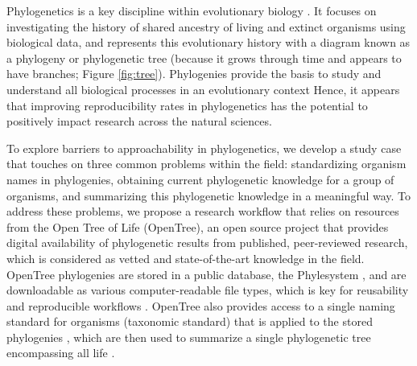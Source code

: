 \documentclass[12pt]{article}
\begin{document}
Phylogenetics is a key discipline within evolutionary biology \citep{dobzhansky1973nothing}.
It focuses on investigating the history of shared ancestry of living and extinct
organisms using biological data,
and represents this evolutionary history with a diagram known as a phylogeny
or phylogenetic tree (because it grows through time and appears to have branches;
Figure \ref{fig:tree}).
Phylogenies provide the basis to study and understand all biological processes
in an evolutionary context \citep{dobzhansky1973nothing}
Hence, it appears that improving reproducibility rates in phylogenetics has the
potential to positively impact research across the natural sciences.

To explore barriers to approachability in phylogenetics, we develop a study case
that touches on three common problems within the field: standardizing
organism names in phylogenies, obtaining current phylogenetic knowledge for a group of organisms,
and summarizing this phylogenetic knowledge in a meaningful way.
To address these problems, we propose a research workflow that relies on resources from the Open
Tree of Life (OpenTree), an open source project that provides
digital availability of phylogenetic results from published, peer-reviewed research, which
is considered as vetted and state-of-the-art knowledge in the field.
OpenTree phylogenies are stored in a public database, the Phylesystem \citep{mctavish2015phylesystem},
and are downloadable as various computer-readable file types, which is key for reusability
and reproducible workflows \citep{CITATION}.
OpenTree also provides access to a single naming standard for organisms (taxonomic standard)
that is applied to the stored phylogenies \citep{rees2017automated}, which are
then used to summarize a single phylogenetic tree encompassing all life \citep{opentreeoflife2019synth}.
\end{document}
